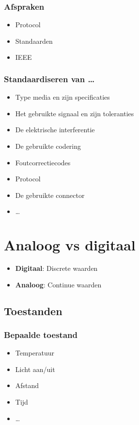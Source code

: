 \documentclass{article}
\newcommand{\bold}[1]{\textbf{#1}}
\begin{document}
\subsubsection{Afspraken}
\begin{itemize}
    \item Protocol
    \item Standaarden
    \item IEEE
\end{itemize}

\subsubsection{Standaardiseren van \dots}
\begin{itemize}
    \item Type media en zijn specificaties
    \item Het gebruikte signaal en zijn toleranties
    \item De elektrische interferentie
    \item De gebruikte codering
    \item Foutcorrectiecodes
    \item Protocol
    \item De gebruikte connector
    \item \dots
\end{itemize}

\section{Analoog vs digitaal}
\begin{itemize}
    \item \bold{Digitaal}: Discrete waarden
    \item \bold{Analoog}: Continue waarden
\end{itemize}
\subsection{Toestanden}
\subsubsection{Bepaalde toestand}
\begin{itemize}
    \item Temperatuur
    \item Licht aan/uit
    \item Afstand
    \item Tijd
    \item \dots
\end{itemize}
\end{document}
